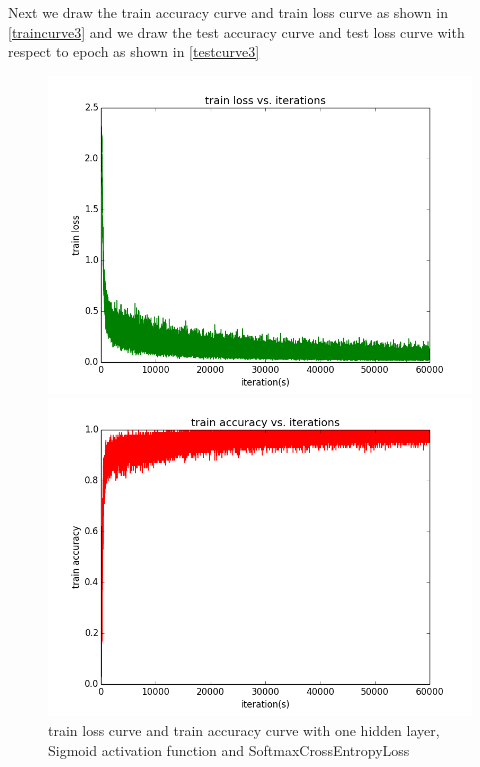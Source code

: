 \documentclass{elegantbook}
\begin{document}
Next we draw the train accuracy curve and train loss curve as shown in \ref{traincurve3} and we draw the test accuracy curve and test loss curve with respect to epoch as shown in \ref{testcurve3}
\begin{figure}[!ht]
	\centering
	\begin{minipage}[t]{0.45\textwidth}
		\centering
		\includegraphics[width=\textwidth]{trainloss1ss}
	\end{minipage}
	\begin{minipage}[t]{0.45\textwidth}
		\centering
		\includegraphics[width=\textwidth]{trainacc1ss}
	\end{minipage}
	\caption{\label{traincurve4}train loss curve and train accuracy curve with one hidden layer, Sigmoid activation function and SoftmaxCrossEntropyLoss}
\end{figure}
\end{document}
